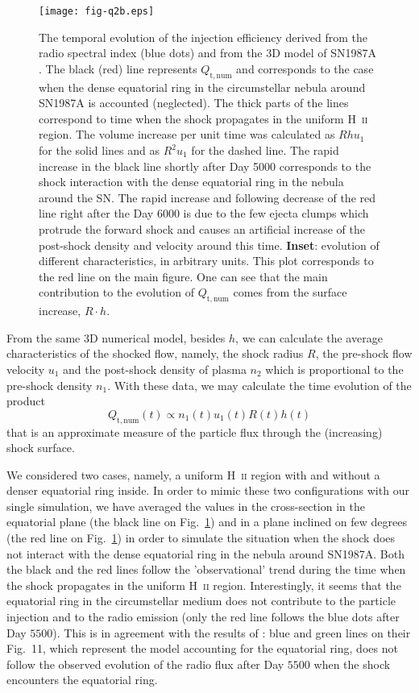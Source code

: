 \documentclass{aa}
\newcommand\rs[1]{_\mathrm{#1}}
\begin{document}
\begin{figure}
 \centering
 \texttt{[image: fig-q2b.eps]}
 \caption{The temporal evolution of the injection efficiency derived from the radio spectral index (blue dots) and from the 3D model of SN1987A \citep{orlando-etal-2015}. 
The black (red) line represents $Q\rs{t,num}$ and corresponds to the case when the dense equatorial ring in the circumstellar nebula around SN1987A is accounted (neglected). The thick parts of the lines correspond to time when the shock propagates in the uniform H~\textsc{ii} region. The volume increase per unit time was calculated as $Rhu_1$ for the solid lines and as $R^2u_1$ for the dashed line. The rapid increase in the black line shortly after Day 5000 corresponds to the shock interaction with the dense equatorial ring in the nebula around the SN. The rapid increase and following decrease of the red line right after the Day 6000 is due to the few ejecta clumps which protrude the forward shock and causes an artificial increase of the post-shock density and velocity around this time. \textbf{Inset}: evolution of different characteristics, in arbitrary units. This plot corresponds to the red line on the main figure. One can see that the main contribution to the evolution of $Q\rs{t,num}$ comes from the surface increase, $R\cdot h$.
               }
 \label{alpha:figq2}
\end{figure}

From the same 3D numerical model, besides $h$, we can calculate the average characteristics of the shocked flow, namely, the shock radius $R$, the pre-shock flow velocity $u_1$ and the post-shock density of plasma $n_2$ which is proportional to the pre-shock density $n_1$. With these data, we may calculate the time evolution of the product
\begin{equation}
 Q\rs{t,num}(t) \propto n_1(t) u_1(t) R(t) h(t)
\label{alpha:Qtnum}
\end{equation} 
that is an approximate measure of the particle flux through the (increasing) shock surface. 

We considered two cases, namely, a uniform H~\textsc{ii} region with and without a denser equatorial ring inside. In order to mimic these two configurations with our single simulation, we have averaged the values in the cross-section in the equatorial plane (the black line on Fig.~\ref{alpha:figq2}) and in a plane inclined on few degrees (the red line on Fig.~\ref{alpha:figq2}) in order to simulate the situation when the shock does not interact with the dense equatorial ring in the nebula around SN1987A. Both the black and the red lines follow the 'observational' trend during the time when the shock propagates in the uniform H~\textsc{ii} region. Interestingly, it seems that the equatorial ring in the circumstellar medium does not contribute to the particle injection and to the radio emission (only the red line follows the blue dots after Day $5500$). This is in agreement with the results of \citet{potter-etal-2014}: blue and green lines on their Fig.~11, which represent the model accounting for the equatorial ring, does not follow the observed evolution of the radio flux after Day $5500$ when the shock encounters the equatorial ring. 
\end{document}
